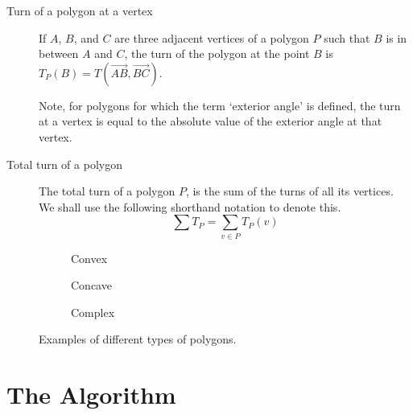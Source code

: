 \documentclass{article}
\newcommand{\vecl}{\overrightarrow} %
\begin{document}
\begin{description}
	\item[Turn of a polygon at a vertex]
		If \(A\), \(B\), and \(C\) are three adjacent vertices of a polygon \(P\) such that \(B\) is in between \(A\) and \(C\), the turn of the polygon at the point \(B\) is \(T_P(B) = T(\vecl{AB}, \vecl{BC})\).

		Note, for polygons for which the term `exterior angle' is defined, the turn at a vertex is equal to the absolute value of the exterior angle at that vertex.

	\item[Total turn of a polygon]
		The total turn of a polygon \(P\), is the sum of the turns of all its vertices. We shall use the following shorthand notation to denote this.
		\begin{equation*}
			\sum T_P = \sum_{v \in P} T_P(v)
		\end{equation*}
\end{description}

\begin{figure}[htbp]
	\centering
	\begin{subfigure}{0.25\textwidth}
		\centering
		\caption{Convex}
	\end{subfigure}%
	\begin{subfigure}{0.25\textwidth}
		\centering
		\caption{Concave}
	\end{subfigure}%
	\begin{subfigure}{0.25\textwidth}
		\centering
		\caption{Complex}
	\end{subfigure}%
	\caption{Examples of different types of polygons.}
	\label{}
\end{figure}

\section{The Algorithm}
\end{document}
